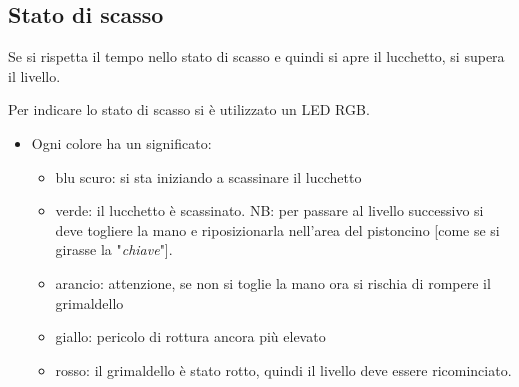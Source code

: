 \clearpage
\subsection{Stato di scasso}
Se si rispetta il tempo nello stato di scasso e quindi si apre il lucchetto, si supera il livello.

Per indicare lo stato di scasso si è utilizzato un LED RGB. 
\begin{itemize}
	\item Ogni colore ha un significato:
	\begin{itemize}
		\item blu scuro: si sta iniziando a scassinare il lucchetto
		\item verde: il lucchetto è scassinato.
			\subitem NB: per passare al livello successivo si deve togliere la mano e riposizionarla nell'area del pistoncino [come se si girasse la "\textit{chiave}"].
		\item arancio: attenzione, se non si toglie la mano ora si rischia di rompere il grimaldello
		\item giallo: pericolo di rottura ancora più elevato
		\item rosso: il grimaldello è stato rotto, quindi il livello deve essere ricominciato.
	\end{itemize}
\end{itemize}